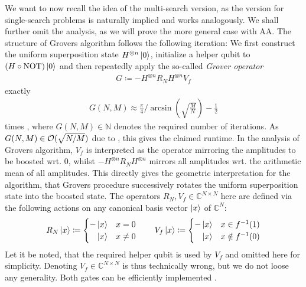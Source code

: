 We want to now recall the idea of the multi-search version, as the version for single-search problems is naturally implied and works analogously. We shall further omit the analysis, as we will prove the more general case with AA. The structure of Grovers algorithm follows the following iteration: We first construct the uniform superposition state \(H^{\otimes n}\ket{0}\), initialize a helper qubit to \((H \circ \operatorname{NOT})\ket{0}\) and then repeatedly apply the so-called \emph{Grover operator} \cite[p. 146]{Homeister2018}
\begin{align}
    G \coloneqq -H^{\otimes n}R_NH^{\otimes n}V_f \label{grover_operator}
\end{align}
exactly
\begin{align}
    G(N, M) \approx\frac{\pi}{4} / \arcsin\left(\sqrt{\frac{M}{N}}\right) - \frac{1}{2}
\end{align}
times \cite[p. 153-155]{Homeister2018}, where \(G(N, M) \in \mathbb{N}\) denotes the required number of iterations. As \(G(N, M) \in \operatorname{\mathcal{O}}(\sqrt{N/M})\) due to , this gives the claimed runtime. In the analysis of Grovers algorithm, \(V_f\) is interpreted as the operator mirroring the amplitudes to be boosted wrt. \(0\), whilst \(-H^{\otimes n}R_NH^{\otimes n}\) mirrors all amplitudes wrt. the arithmetic mean of all amplitudes. This directly gives the geometric interpretation for the algorithm, that Grovers procedure successively rotates the uniform superposition state into the boosted state. The operators \(R_N, V_f \in \mathbb{C}^{N \times N}\) here are defined via the following actions on any canonical basis vector \(\ket{x}\) of \(\mathbb{C}^N\):
\begin{align}
    R_N\ket{x} \coloneqq \begin{cases}
        -\ket{x} & x = 0\\
        \phantom{-}\ket{x} & x \neq 0
    \end{cases} \qquad V_f\ket{x} \coloneqq \begin{cases}
        -\ket{x} & x \in f^{-1}(1)\\
        \phantom{-}\ket{x} & x \notin f^{-1}(0)
    \end{cases} \label{grover_mirroring_operations}
\end{align}
Let it be noted, that the required helper qubit is used by \(V_f\) and omitted here for simplicity. Denoting \(V_f\in \mathbb{C}^{N \times N}\) is thus technically wrong, but we do not loose any generality. Both gates can be efficiently implemented \cite[pp. 144-145]{Homeister2018}.

